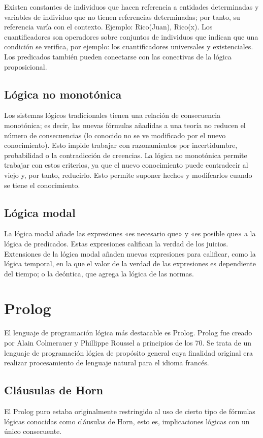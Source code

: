 \documentclass[11pt,captions=nooneline,DIV=14, parskip=full]{scrartcl}
\begin{document}
	Existen constantes de individuos que hacen referencia a entidades determinadas y variables de individuo que no tienen referencias determinadas; por tanto, su referencia varía con el contexto. Ejemplo: Rico(Juan), Rico(x). Los cuantificadores son operadores sobre conjuntos de individuos que indican que una condición se verifica, por ejemplo: los cuantificadores universales y existenciales. Los predicados también pueden conectarse con las conectivas de la lógica proposicional.

\subsection{Lógica no monotónica}

	Los sistemas lógicos tradicionales tienen una relación de consecuencia monotónica; es decir, las nuevas fórmulas añadidas a una teoría no reducen el número de consecuencias (lo conocido no se ve modificado por el nuevo conocimiento). Esto impide trabajar con razonamientos por incertidumbre, probabilidad o la contradicción de creencias. La lógica no monotónica permite trabajar con estos criterios, ya que el nuevo conocimiento puede contradecir al viejo y, por tanto, reducirlo. Esto permite suponer hechos y modifcarlos cuando se tiene el conocimiento.

\subsection{Lógica modal}

	La lógica modal añade las expresiones «es necesario que» y «es posible que» a la lógica de predicados. Estas expresiones califican la verdad de los juicios. Extensiones de la lógica modal añaden nuevas expresiones para calificar, como la lógica temporal, en la que el valor de la verdad de las expresiones es dependiente del tiempo; o la deóntica, que agrega la lógica de las normas.

\section{Prolog}
\label{sec:prolog}

El lenguaje de programación lógica más destacable es Prolog. Prolog fue creado por Alain Colmerauer y Phillippe Roussel a principios de los 70. Se trata de un lenguaje de programación lógica de propósito general cuya finalidad original era realizar procesamiento de lenguaje natural para el idioma francés.

\subsection{Cláusulas de Horn}
\label{subsec:horn}
El Prolog puro estaba originalmente restringido al uso de cierto tipo de fórmulas lógicas conocidas como cláusulas de Horn, esto es, implicaciones lógicas con un único consecuente.
\end{document}
